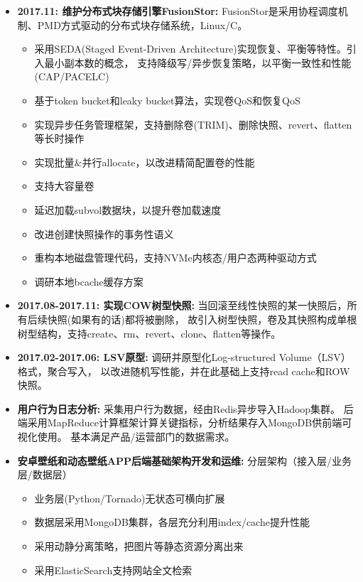   \begin{itemize}[leftmargin=*]
      \item \textbf{2017.11: 维护分布式块存储引擎FusionStor:} FusionStor是采用协程调度机制、PMD方式驱动的分布式块存储系统，Linux/C。
          {\small
          \begin{itemize}
              \item 采用SEDA(Staged Event-Driven Architecture)实现恢复、平衡等特性。引入最小副本数的概念，
                  支持降级写/异步恢复策略，以平衡一致性和性能(CAP/PACELC)
              \item 基于token bucket和leaky bucket算法，实现卷QoS和恢复QoS
              \item 实现异步任务管理框架，支持删除卷(TRIM)、删除快照、revert、flatten等长时操作
              \item 实现批量\&并行allocate，以改进精简配置卷的性能
              \item 支持大容量卷
              \item 延迟加载subvol数据块，以提升卷加载速度
              \item 改进创建快照操作的事务性语义
              \item 重构本地磁盘管理代码，支持NVMe内核态/用户态两种驱动方式
              \item 调研本地bcache缓存方案
          \end{itemize}
          }

      \item \textbf{2017.08-2017.11: 实现COW树型快照:} 当回滚至线性快照的某一快照后，所有后续快照(如果有的话)都将被删除，
          故引入树型快照，卷及其快照构成单根树型结构，支持create、rm、revert、clone、flatten等操作。

      \item \textbf{2017.02-2017.06: LSV原型:} 调研并原型化Log-structured Volume（LSV）格式，聚合写入，
          以改进随机写性能，并在此基础上支持read cache和ROW快照。

      \item \textbf{用户行为日志分析:} 采集用户行为数据，经由Redis异步导入Hadoop集群。
          后端采用MapReduce计算框架计算关键指标，分析结果存入MongoDB供前端可视化使用。
          基本满足产品/运营部门的数据需求。

      \item \textbf{安卓壁纸和动态壁纸APP后端基础架构开发和运维:} 分层架构（接入层/业务层/数据层）
          {\small
          \begin{itemize}
              \item 业务层(Python/Tornado)无状态可横向扩展
              \item 数据层采用MongoDB集群，各层充分利用index/cache提升性能
              \item 采用动静分离策略，把图片等静态资源分离出来
              \item 采用ElasticSearch支持网站全文检索
          \end{itemize}
          }


\end{itemize}
